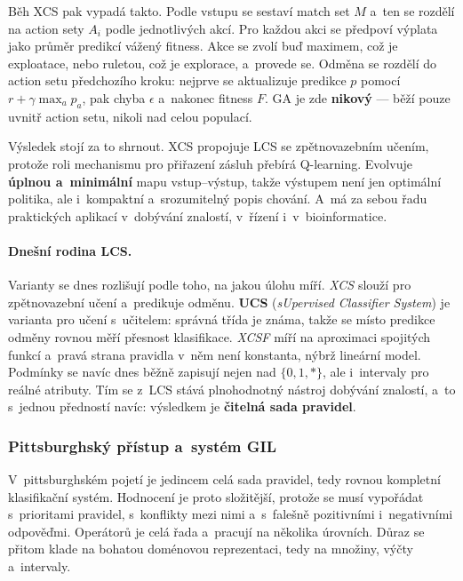 \documentclass[11pt,a4paper]{article}
\theoremstyle{definition}
\begin{document}
Běh XCS pak vypadá takto. Podle vstupu se sestaví match set $M$ a~ten se rozdělí na action
sety $A_i$ podle jednotlivých akcí. Pro každou akci se předpoví výplata jako průměr predikcí
vážený fitness. Akce se zvolí buď maximem, což je exploatace, nebo ruletou, což je explorace,
a~provede se. Odměna se rozdělí do action setu předchozího kroku: nejprve se aktualizuje
predikce $p$ pomocí $r + \gamma \max_a p_a$, pak chyba $\epsilon$ a~nakonec fitness $F$. GA je
zde \textbf{nikový} --- běží pouze uvnitř action setu, nikoli nad celou populací.

Výsledek stojí za to shrnout. XCS propojuje LCS se zpětnovazebním učením, protože roli
mechanismu pro přiřazení zásluh přebírá Q-learning. Evolvuje \textbf{úplnou a~minimální} mapu
vstup--výstup, takže výstupem není jen optimální politika, ale i~kompaktní a~srozumitelný
popis chování. A~má za sebou řadu praktických aplikací v~dobývání znalostí, v~řízení
i~v~bioinformatice.

\paragraph{Dnešní rodina LCS.} Varianty se dnes rozlišují podle toho, na jakou úlohu míří.
\emph{XCS} slouží pro zpětnovazební učení a~predikuje odměnu.
\textbf{UCS} (\emph{sUpervised Classifier System}) je varianta pro učení
s~učitelem: správná třída je známa, takže se místo predikce odměny rovnou měří přesnost
klasifikace. \emph{XCSF} míří na aproximaci spojitých funkcí a~pravá strana pravidla v~něm
není konstanta, nýbrž lineární model. Podmínky se navíc dnes běžně zapisují nejen nad
$\{0,1,*\}$, ale i~intervaly pro reálné atributy. Tím se z~LCS stává plnohodnotný
nástroj dobývání znalostí, a~to s~jednou předností navíc: výsledkem je
\textbf{čitelná sada pravidel}.

\subsubsection{Pittsburghský přístup a~systém GIL}

V~pittsburghském pojetí je jedincem celá sada pravidel, tedy rovnou kompletní klasifikační
systém. Hodnocení je proto složitější, protože se musí vypořádat s~prioritami pravidel,
s~konflikty mezi nimi a~s~falešně pozitivními i~negativními odpověďmi. Operátorů je celá
řada a~pracují na několika úrovních. Důraz se přitom klade na bohatou doménovou reprezentaci,
tedy na množiny, výčty a~intervaly.
\end{document}
